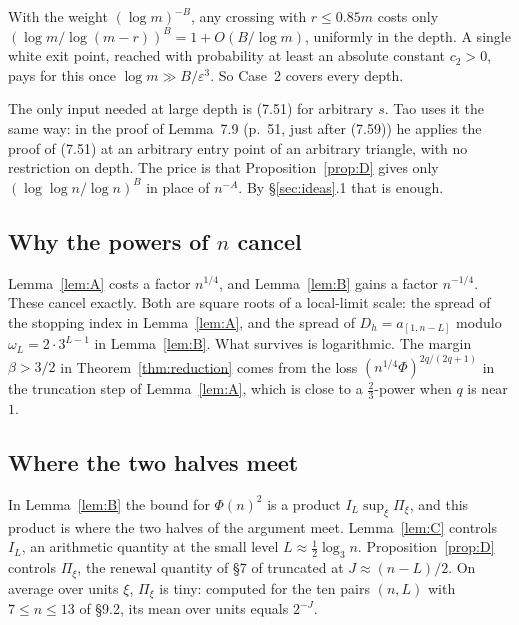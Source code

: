 \documentclass[11pt]{amsart}
\theoremstyle{remark}
\newcommand{\Tc}{\cite{Tao22}}         %
\theoremstyle{plain}
\begin{document}
With the weight $(\log m)^{-B}$, any crossing with $r\le0.85m$ costs only $(\log m/\log(m-r))^B=1+O(B/\log m)$, uniformly in the depth. A single white exit point, reached with probability at least an absolute constant $c_2>0$, pays for this once $\log m\gg B/\varepsilon^3$. So Case~2 covers every depth.

The only input needed at large depth is (7.51) for arbitrary $s$. Tao uses it the same way: in the proof of Lemma~7.9 (p.~51, just after (7.59)) he applies the proof of (7.51) at an arbitrary entry point of an arbitrary triangle, with no restriction on depth. The price is that Proposition~\ref{prop:D} gives only $(\log\log n/\log n)^B$ in place of $n^{-A}$. By \S\ref{sec:ideas}.1 that is enough.

\subsection{Why the powers of $n$ cancel}

Lemma~\ref{lem:A} costs a factor $n^{1/4}$, and Lemma~\ref{lem:B} gains a factor $n^{-1/4}$. These cancel exactly. Both are square roots of a local-limit scale: the spread of the stopping index in Lemma~\ref{lem:A}, and the spread of $D_h=a_{[1,n-L]}$ modulo $\omega_L=2\cdot3^{L-1}$ in Lemma~\ref{lem:B}. What survives is logarithmic. The margin $\beta>3/2$ in Theorem~\ref{thm:reduction} comes from the loss $(n^{1/4}\Phi)^{2q/(2q+1)}$ in the truncation step of Lemma~\ref{lem:A}, which is close to a $\tfrac23$-power when $q$ is near $1$.

\subsection{Where the two halves meet}

In Lemma~\ref{lem:B} the bound for $\Phi(n)^2$ is a product $I_L\sup_\xi\Pi_\xi$, and this product is where the two halves of the argument meet. Lemma~\ref{lem:C} controls $I_L$, an arithmetic quantity at the small level $L\approx\tfrac12\log_3n$. Proposition~\ref{prop:D} controls $\Pi_\xi$, the renewal quantity of \S7 of \Tc{} truncated at $J\approx(n-L)/2$. On average over units $\xi$, $\Pi_\xi$ is tiny: computed for the ten pairs $(n,L)$ with $7\le n\le13$ of \S9.2, its mean over units equals $2^{-J}$.
\end{document}
